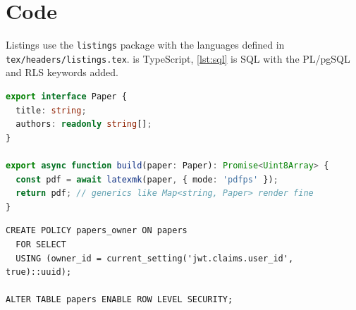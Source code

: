\section{Code}
\label{sec:code}

Listings use the \texttt{listings} package with the languages defined in
\texttt{tex/headers/listings.tex}.  is TypeScript,
\cref{lst:sql} is SQL with the PL/pgSQL and RLS keywords added.

\begin{lstlisting}[language=typescript,caption={A TypeScript listing.},label={lst:ts}]
export interface Paper {
  title: string;
  authors: readonly string[];
}

export async function build(paper: Paper): Promise<Uint8Array> {
  const pdf = await latexmk(paper, { mode: 'pdfps' });
  return pdf; // generics like Map<string, Paper> render fine
}
\end{lstlisting}

\begin{lstlisting}[language=sql-extended,caption={A SQL listing.},label={lst:sql}]
CREATE POLICY papers_owner ON papers
  FOR SELECT
  USING (owner_id = current_setting('jwt.claims.user_id', true)::uuid);

ALTER TABLE papers ENABLE ROW LEVEL SECURITY;
\end{lstlisting}
